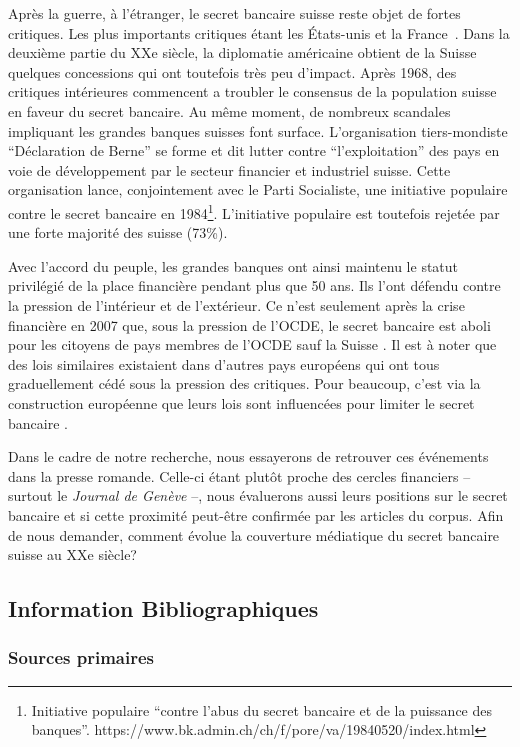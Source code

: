 \documentclass[a4paper, 11pt]{article}
\begin{document}
Après la guerre, à l'étranger, le secret bancaire suisse reste objet de fortes
critiques. Les plus importants critiques étant les États-unis et la
France~\citep[p. 503]{Mazbouri12}. Dans la deuxième partie du XXe siècle, la
diplomatie américaine obtient de la Suisse quelques concessions qui ont
toutefois très peu d'impact. Après 1968, des critiques intérieures commencent a
troubler le consensus de la population suisse en faveur du secret bancaire. Au
même moment, de nombreux scandales impliquant les grandes banques suisses font
surface. L’organisation tiers-mondiste “Déclaration de Berne” \citep{EvB} se
forme et dit lutter contre ``l'exploitation'' des pays en voie de développement
par le secteur financier et industriel suisse. Cette organisation lance,
conjointement avec le Parti Socialiste, une initiative populaire contre le
secret bancaire en 1984\footnote{Initiative populaire ``contre l'abus du secret
bancaire et de la puissance des banques''.
https://www.bk.admin.ch/ch/f/pore/va/19840520/index.html}. L'initiative
populaire est toutefois rejetée par une forte majorité des suisse (73\%).

Avec l'accord du peuple, les grandes banques ont ainsi maintenu le
statut privilégié de la place financière pendant plus que 50 ans. Ils l’ont
défendu contre la pression de l’intérieur et de l’extérieur. Ce n’est
seulement après la crise financière en 2007 que, sous la pression de l'OCDE,
le secret bancaire est aboli pour les citoyens de pays membres de l'OCDE
sauf la Suisse \citep{NeufVies}.
Il est à noter que des lois similaires existaient dans d'autres pays européens
qui ont tous graduellement cédé sous la pression des critiques. Pour beaucoup,
c'est via la construction européenne que leurs lois sont influencées pour
limiter le secret bancaire \citep[p. 32]{Palan09}.

Dans le cadre de notre recherche, nous essayerons de retrouver ces événements
dans la presse romande. Celle-ci étant plutôt proche des cercles financiers –
surtout le \textit{Journal de Genève} \citep{ConfClass1} –, nous évaluerons aussi
leurs positions sur le secret bancaire et si cette proximité peut-être
confirmée par les articles du corpus. Afin de nous demander, comment évolue la
couverture médiatique du secret bancaire suisse au XXe siècle?

\subsection{Information Bibliographiques}
\subsubsection{Sources primaires}
\end{document}
